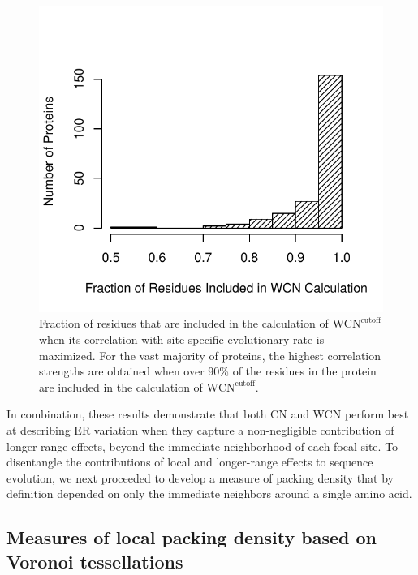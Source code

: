 \documentclass[12pt]{article}
\begin{document}
    \begin{figure}
        \begin{center}
            \includegraphics[width=6in]{WCN_fraction_of_residues_included.pdf}
        \end{center}
        \caption{Fraction of residues that are included in the calculation of $\text{WCN}^\text{cutoff}$ when its correlation with site-specific evolutionary rate is maximized. For the vast majority of proteins, the highest correlation strengths are obtained when over 90\% of the residues in the protein are included in the calculation of $\text{WCN}^\text{cutoff}$.}
        \label{fig:wcn_pwrl_cutoff}
    \end{figure}

In combination, these results demonstrate that both CN and WCN perform best at describing ER variation when they capture a non-negligible contribution of longer-range effects, beyond the immediate neighborhood of each focal site. To disentangle the contributions of local and longer-range effects to sequence evolution, we next proceeded to develop a measure of packing density that by definition depended on only the immediate neighbors around a single amino acid.


\subsection*{Measures of local packing density based on Voronoi tessellations}
\end{document}
